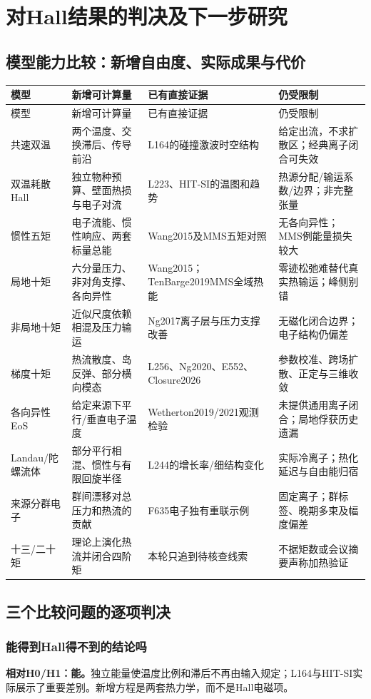 \chapter{对Hall结果的判决及下一步研究}
\section{模型能力比较：新增自由度、实际成果与代价}
\small
\begin{longtable}{P{26mm}P{39mm}P{43mm}P{34mm}}
\toprule 模型 & 新增可计算量 & 已有直接证据 & 仍受限制\\\midrule\endfirsthead
\toprule 模型 & 新增可计算量 & 已有直接证据 & 仍受限制\\\midrule\endhead
共速双温 & 两个温度、交换滞后、传导前沿 & L164的碰撞激波时空结构 & 给定出流，不求扩散区；经典离子闭合可失效\\
双温耗散Hall & 独立物种预算、壁面热损与电子对流 & L223、HIT-SI的温图和趋势 & 热源分配/输运系数/边界；非完整张量\\
惯性五矩 & 电子流能、惯性响应、两套标量总能 & Wang2015及MMS五矩对照 & 无各向异性；MMS例能量损失较大\\
局地十矩 & 六分量压力、非对角支撑、各向异性 & Wang2015；TenBarge2019MMS全域热能 & 零迹松弛难替代真实热输运；峰侧别错\\
非局地十矩 & 近似尺度依赖相混及压力输运 & Ng2017离子层与压力支撑改善 & 无磁化闭合边界；电子结构仍偏差\\
梯度十矩 & 热流散度、岛反弹、部分横向模态 & L256、Ng2020、E552、Closure2026 & 参数校准、跨场扩散、正定与三维收敛\\
各向异性EoS & 给定来源下平行/垂直电子温度 & Wetherton2019/2021观测检验 & 未提供通用离子闭合；局地俘获历史遗漏\\
Landau/陀螺流体 & 部分平行相混、惯性与有限回旋半径 & L244的增长率/细结构变化 & 实际冷离子；热化延迟与自由能归宿\\
来源分群电子 & 群间漂移对总压力和热流的贡献 & F635电子独有重联示例 & 固定离子；群标签、晚期多束及幅度偏差\\
十三/二十矩 & 理论上演化热流并闭合四阶矩 & 本轮只追到待核查线索 & 不据矩数或会议摘要声称加热验证\\
\bottomrule\end{longtable}
\normalsize

\section{三个比较问题的逐项判决}
\subsection{能得到Hall得不到的结论吗}
\textbf{相对H0/H1：能。}独立能量使温度比例和滞后不再由输入规定；L164与HIT-SI实际展示了重要差别。新增方程是两套热力学，而不是Hall电磁项。


